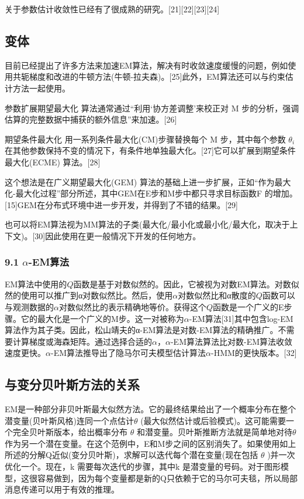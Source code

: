 关于参数估计收敛性已经有了很成熟的研究。[21][22][23][24]

\subsection{变体}

目前已经提出了许多方法来加速EM算法，解决有时收敛速度缓慢的问题，例如使用共轭梯度和改进的牛顿方法(牛顿-拉夫森)。[25]此外，EM算法还可以与约束估计方法一起使用。

参数扩展期望最大化 算法通常通过“利用‘协方差调整’来校正对 M 步的分析，强调估算的完整数据中捕获的额外信息”来加速。[26]

期望条件最大化 用一系列条件最大化(CM)步骤替换每个 M 步，其中每个参数 $\theta_i$ 在其他参数保持不变的情况下，有条件地单独最大化。[27]它可以扩展到期望条件最大化(ECME) 算法。[28]

这个想法是在广义期望最大化(GEM) 算法的基础上进一步扩展，正如“作为最大化-最大化过程”部分所述，其中GEM在E步和M步中都只寻求目标函数F 的增加。[15]GEM在分布式环境中进一步开发，并得到了不错的结果。[29]

也可以将EM算法视为MM算法的子类(最大化/最小化或最小化/最大化，取决于上下文)。[30]因此使用在更一般情况下开发的任何地方。

\subsubsection{9.1 $\alpha$-EM算法}

EM算法中使用的$Q$函数是基于对数似然的。因此，它被视为对数EM算法。对数似然的使用可以推广到α对数似然比。然后，使用$\alpha$对数似然比和α散度的$Q$函数可以与观测数据的$\alpha$对数似然比的表示精确地等价。获得这个$Q$函数是一个广义的E步骤。它的最大化是一个广义的M步。这一对被称为$\alpha$-EM算法[31]其中包含log-EM算法作为其子类。因此，松山靖夫的α-EM算法是对数-EM算法的精确推广。不需要计算梯度或海森矩阵。通过选择合适的$\alpha$，$\alpha$-EM算法算法比对数-EM算法收敛速度更快。$\alpha$-EM算法推导出了隐马尔可夫模型估计算法$\alpha$-HMM的更快版本。[32]

\subsection{与变分贝叶斯方法的关系}

EM是一种部分非贝叶斯最大似然方法。它的最终结果给出了一个概率分布在整个潜变量(贝叶斯风格)连同一个点估计$\theta$ (最大似然估计或后验模式)。这可能需要一个完全贝叶斯版本，给出概率分布 $\theta$ 和潜变量。贝叶斯推断方法就是简单地对待$\theta$ 作为另一个潜在变量。在这个范例中，E和M步之间的区别消失了。如果使用如上所述的分解Q近似(变分贝叶斯)，求解可以迭代每个潜在变量(现在包括 $\theta$ )并一次优化一个。现在，k 需要每次迭代的步骤，其中k 是潜变量的号码。对于图形模型，这很容易做到，因为每个变量都是新的Q只依赖于它的马尔可夫毯，所以局部消息传递可以用于有效的推理。

